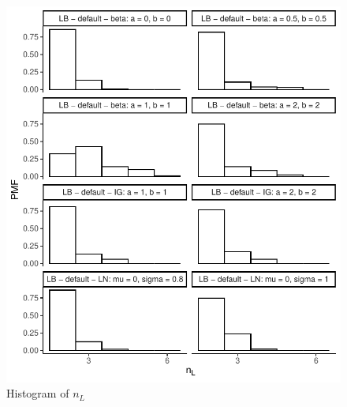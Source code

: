 \documentclass{amsart}
\begin{document}
\begin{figure}[ht]
	\centering
	\includegraphics[width=0.95\linewidth]{hist_nl_5.pdf}
	\caption{Histogram of $n_L$}
	\label{fig:hist:nl:5}
\end{figure}
\end{document}

